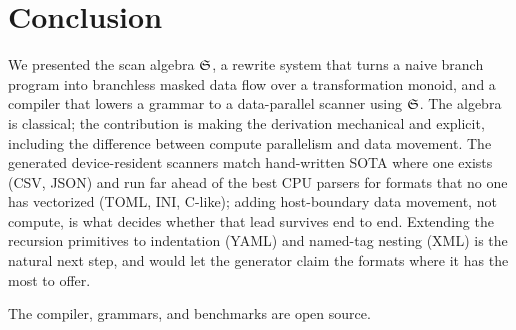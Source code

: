 \section{Conclusion}
\label{sec:conclusion}

We presented the scan algebra $\mathfrak{S}$, a rewrite system that turns a naive branch program
into branchless masked data flow over a transformation monoid, and a compiler
that lowers a grammar to a data-parallel scanner using $\mathfrak{S}$.  The algebra is
classical; the contribution is making the derivation mechanical and explicit,
including the difference between compute parallelism and data movement.  The
generated device-resident scanners match hand-written SOTA where one exists
(CSV, JSON) and run far ahead of the best CPU parsers for formats that no one
has vectorized (TOML, INI, C-like); adding host-boundary data movement, not
compute, is what decides whether that lead survives end to end.
Extending the recursion primitives to indentation (YAML) and
named-tag nesting (XML) is the natural next step, and would let the generator
claim the formats where it has the most to offer.

The compiler, grammars, and benchmarks are open source.

